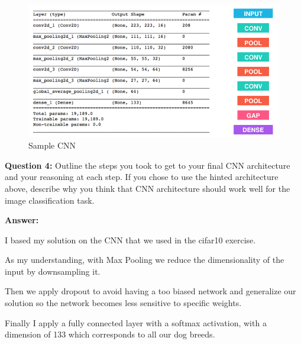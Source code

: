 \documentclass[11pt]{article}
\makeatletter
\def\maxwidth{\ifdim\Gin@nat@width>\linewidth\linewidth
    \else\Gin@nat@width\fi}
\let\Oldincludegraphics\includegraphics
\renewcommand{\includegraphics}[1]{\Oldincludegraphics[width=.8\maxwidth]{#1}}
\makeatother
\begin{document}
\begin{figure}
\centering
\includegraphics{images/sample_cnn.png}
\caption{Sample CNN}
\end{figure}

\textbf{Question 4:} Outline the steps you took to get to your final CNN
architecture and your reasoning at each step. If you chose to use the
hinted architecture above, describe why you think that CNN architecture
should work well for the image classification task.

\textbf{Answer:}

I based my solution on the CNN that we used in the cifar10 exercise.

As my understanding, with Max Pooling we reduce the dimensionality of
the input by downsampling it.

Then we apply dropout to avoid having a too biased network and
generalize our solution so the network becomes less sensitive to
specific weights.

Finally I apply a fully connected layer with a softmax activation, with
a dimension of 133 which corresponds to all our dog breeds.
\end{document}

